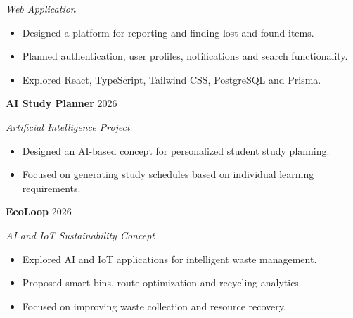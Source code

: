\documentclass[11pt,a4paper]{article}
\begin{document}
\textit{Web Application}

\begin{itemize}

    \item Designed a platform for reporting and
    finding lost and found items.

    \item Planned authentication, user profiles,
    notifications and search functionality.

    \item Explored React, TypeScript, Tailwind CSS,
    PostgreSQL and Prisma.

\end{itemize}


\textbf{AI Study Planner}
\hfill
2026

\textit{Artificial Intelligence Project}

\begin{itemize}

    \item Designed an AI-based concept for
    personalized student study planning.

    \item Focused on generating study schedules
    based on individual learning requirements.

\end{itemize}


\textbf{EcoLoop}
\hfill
2026

\textit{AI and IoT Sustainability Concept}

\begin{itemize}

    \item Explored AI and IoT applications for
    intelligent waste management.

    \item Proposed smart bins, route optimization
    and recycling analytics.

    \item Focused on improving waste collection
    and resource recovery.

\end{itemize}

\end{document}
